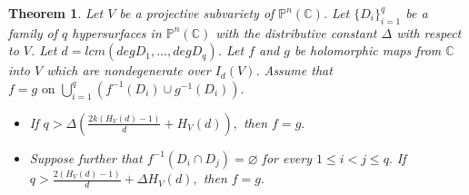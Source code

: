 \documentclass[10pt,a4paper]{amsart}
\newtheorem{theorem}{Theorem}
\newcommand{\C}{{\mathbb{C}}}
\begin{document}
\begin{theorem}\label{1.2}
Let $V$ be a projective subvariety of $\mathbb P^n(\mathbb C)$.  Let $\{D_i\}_{i=1}^q$ be a family of $q$ hypersurfaces in $\mathbb P^n(\mathbb C)$ with the distributive constant $\Delta$ with respect to $V$. Let $d=lcm (deg D_1,...,deg D_q)$. Let $f$ and $g$ be holomorphic maps from $\C$ into $V$ which are nondegenerate over $I_d(V)$.  Assume that $f=g \text{ on }\bigcup_{i=1}^q(f^{-1}(D_i)\cup g^{-1}(D_i)).$
\begin{itemize}
    \item[(a)] If $q>\Delta\left(\frac{2k(H_V(d)-1)}{d}+ H_V(d)\right),$ then $f=g.$
    \item[(b)] Suppose further that $f^{-1}(D_i\cap D_j)=\varnothing$ for every $1\le i< j\le q.$ If $q>\frac{2(H_V(d)-1)}{d}+\Delta H_V(d),$ then $f=g.$
\end{itemize}
\end{theorem}
\end{document}
